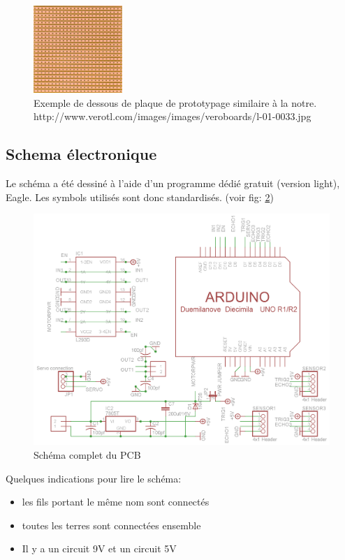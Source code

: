 \documentclass[a4paper,11pt]{report}
\begin{document}
{\begin{figure}[h]
\centering
\includegraphics[width=0.3\textwidth]{figures/StripBoard}
    \caption[Strip-	board]{\label{StripBoard}Exemple de dessous de plaque de prototypage
      similaire à la notre. http://www.verotl.com/images/images/veroboards/l-01-0033.jpg
    }
\end{figure}

\subsection{Schema électronique}
Le schéma a été dessiné à l'aide d'un programme dédié gratuit (version light),
Eagle. Les symbols utilisés sont donc standardisés.
(voir fig: \ref{schemaChineComplet})

\begin{figure}[h!]
\centering
\includegraphics[angle=90, width=1.1\textwidth]{figures/schema_CHI.png}
\caption{\label{schemaChineComplet}Schéma complet du PCB
}
\end{figure}

Quelques indications pour lire le schéma:

\begin{itemize}
\item les fils portant le même nom sont connectés
\item toutes les terres sont connectées ensemble
\item Il y a un circuit 9V et un circuit 5V
\end{itemize}

}
\end{document}
